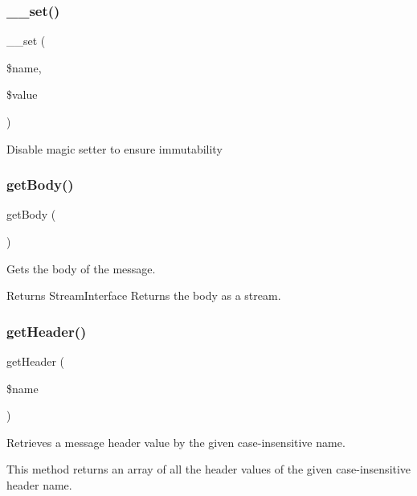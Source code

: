 \subsubsection{\texorpdfstring{\+\_\+\+\_\+set()}{\_\_set()}}
{\footnotesize\ttfamily \+\_\+\+\_\+set (\begin{DoxyParamCaption}\item[{}]{\$name,  }\item[{}]{\$value }\end{DoxyParamCaption})}

Disable magic setter to ensure immutability \mbox{\label{class_pes_1_1_http_1_1_message_ad7bab1db052fb9fcc8bd0b4f3eac29ac}} 
\subsubsection{\texorpdfstring{get\+Body()}{getBody()}}
{\footnotesize\ttfamily get\+Body (\begin{DoxyParamCaption}{ }\end{DoxyParamCaption})}

Gets the body of the message.

\begin{DoxyReturn}{Returns}
Stream\+Interface Returns the body as a stream. 
\end{DoxyReturn}
\mbox{\label{class_pes_1_1_http_1_1_message_a5b0169d9fabf145a619f35da410bc5d0}} 
\subsubsection{\texorpdfstring{get\+Header()}{getHeader()}}
{\footnotesize\ttfamily get\+Header (\begin{DoxyParamCaption}\item[{}]{\$name }\end{DoxyParamCaption})}

Retrieves a message header value by the given case-\/insensitive name.

This method returns an array of all the header values of the given case-\/insensitive header name.


